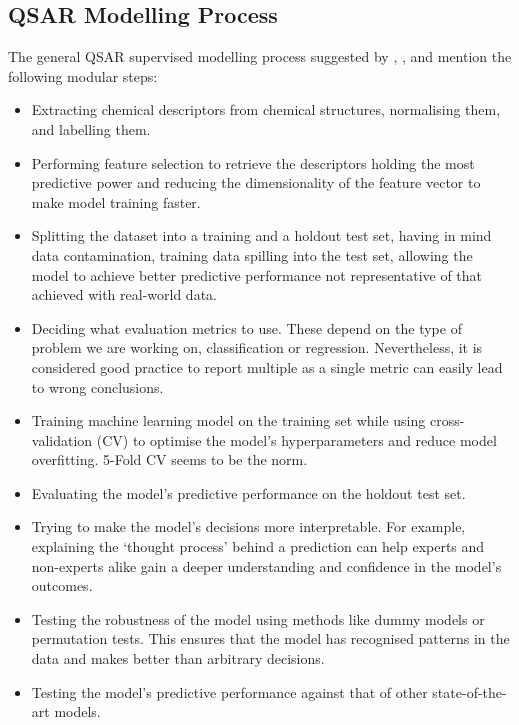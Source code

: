 \subsection{QSAR Modelling Process}

The general QSAR supervised modelling process suggested by \citet{Lo2018}, \citet{Shar2016}, and \citet{Wang2020} mention the following modular steps:

\begin{itemize}
    \item
    Extracting chemical descriptors from chemical structures, normalising them, and labelling them.
    \item    
    Performing feature selection to retrieve the descriptors holding the most predictive power and reducing the dimensionality of the feature vector to make model training faster.
    \item
    Splitting the dataset into a training and a holdout test set, having in mind data contamination, training data spilling into the test set, allowing the model to achieve better predictive performance not representative of that achieved with real-world data.
    \item
    Deciding what evaluation metrics to use. These depend on the type of problem we are working on, classification or regression. Nevertheless, it is considered good practice to report multiple as a single metric can easily lead to wrong conclusions.
    \item
    Training machine learning model on the training set while using cross-validation (CV) to optimise the model's hyperparameters and reduce model overfitting. 5-Fold CV seems to be the norm.
    \item
    Evaluating the model's predictive performance on the holdout test set.
    \item
    Trying to make the model's decisions more interpretable. For example, explaining the `thought process' behind a prediction can help experts and non-experts alike gain a deeper understanding and confidence in the model's outcomes.
    \item
    Testing the robustness of the model using methods like dummy models or permutation tests. This ensures that the model has recognised patterns in the data and makes better than arbitrary decisions.
    \item
    Testing the model's predictive performance against that of other state-of-the-art models.
\end{itemize}

